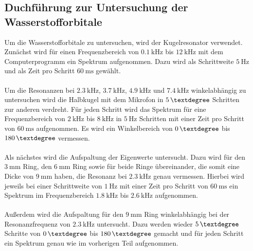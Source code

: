 \subsection{Duchführung zur Untersuchung der Wasserstofforbitale}
Um die Wasserstofforbitale zu untersuchen, wird der Kugelresonator verwendet.
Zunächst wird für einen Frequenzbereich von $\qty{0.1}{\kilo\hertz}$ bis $\qty{12}{\kilo\hertz}$ mit dem Computerprogramm ein Spektrum aufgenommen. 
Dazu wird als Schrittweite $\qty{5}{\hertz}$ und als Zeit pro Schritt $\qty{60}{\milli\second}$ gewählt.
\\\\
Um die Resonanzen bei $\qty{2.3}{\kilo\hertz}$, $\qty{3.7}{\kilo\hertz}$, $\qty{4.9}{\kilo\hertz}$ und $\qty{7.4}{\kilo\hertz}$ winkelabhängig zu untersuchen wird die Halbkugel mit dem Mikrofon in $5 \, \textdegree$ Schritten zur anderen verdreht.
Für jeden Schritt wird das Spektrum für eine Frequenzbereich von $\qty{2}{\kilo\hertz}$ bis $\qty{8}{\kilo\hertz}$ in  $\qty{5}{\hertz}$ Schritten mit einer Zeit pro Schritt von $\qty{60}{\milli\second}$ aufgenommen. 
Es wird ein Winkelbereich von $0 \, \textdegree$ bis $180 \, \textdegree$ vermessen.
\\\\
Als nächstes wird die Aufspaltung der Eigenwerte untersucht. 
Dazu wird für den $\qty{3}{\milli\meter}$ Ring, den $\qty{6}{\milli\meter}$ Ring sowie für beide Ringe übereinander, die somit eine Dicke von $\qty{9}{\milli\meter}$ haben, die Resonanz bei $\qty{2.3}{\kilo\hertz}$ genau vermessen. 
Hierbei wird jeweils bei einer Schrittweite von $\qty{1}{\hertz}$ mit einer Zeit pro Schritt von $\qty{60}{\milli\second}$ ein Spektrum im Frequenzbereich $\qty{1.8}{\kilo\hertz}$ bis $\qty{2.6}{\kilo\hertz}$ aufgenommen.
\\\\
Außerdem wird die Aufspaltung für den $\qty{9}{\milli\meter}$ Ring winkelabhängig bei der Resonanzfrequenz von $\qty{2.3}{\kilo\hertz}$ untersucht. 
Dazu werden wieder $5 \, \textdegree$ Schritte von $0 \, \textdegree$ bis $180 \, \textdegree$ gemacht und für jeden Schritt ein Spektrum genau wie im vorherigen Teil aufgenommen.
\FloatBarrier\noindent
